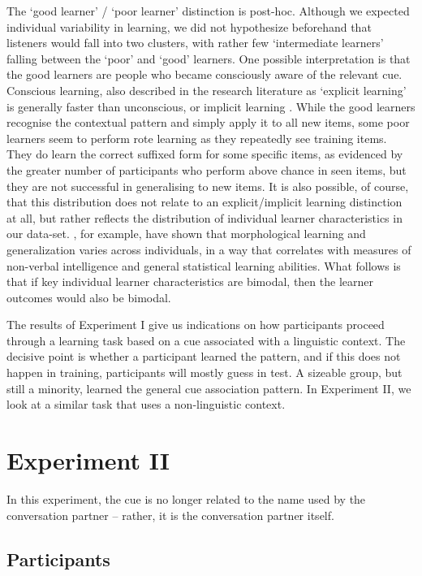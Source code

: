 \documentclass{frontiersSCNS} %
\begin{document}
 The `good learner' / `poor learner' distinction is post-hoc. Although we expected individual variability in learning, we did not hypothesize beforehand that listeners would fall into two clusters, with rather few `intermediate learners' falling between the `poor' and `good' learners. One possible interpretation  is that the good learners are people who became consciously aware of the relevant cue. Conscious learning, also described in the research literature as `explicit learning' is generally faster than unconscious, or implicit learning \citep{goujon2015investigating}. 
While the good learners recognise the contextual pattern and simply apply it to all new items, some poor learners seem to perform rote learning as they repeatedly see training items. They do learn the correct suffixed form for some specific items, as evidenced by the greater number of participants who perform above chance in seen items,  but they are not successful in generalising to new items.  It is also possible, of course, that this distribution does not relate to an explicit/implicit learning distinction at all, but rather reflects the distribution of individual learner characteristics in our data-set. \cite{brooks2016distributional}, for example, have shown that morphological learning and generalization varies across individuals, in a way that correlates with measures of non-verbal intelligence and general statistical learning abilities. What follows is that if key individual learner characteristics are bimodal, then the learner outcomes would also be bimodal.{}

The results of Experiment I give us indications on how participants proceed through a learning task based on a cue associated with a linguistic context. The decisive point is whether a participant learned the pattern, and if this does not happen in training, participants will mostly guess in test.  A sizeable group, but still a minority, learned the general cue association pattern. In Experiment II, we look at a similar task that uses a non-linguistic context.

\section{Experiment II}


In this experiment, the cue is no longer related to the name used by the conversation partner -- rather, it is the conversation partner itself.


\subsection{Participants}
\end{document}
